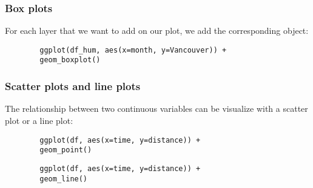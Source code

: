 \documentclass{beamer}
\begin{document}
	\begin{frame}[fragile]
		\frametitle{Box plots}

		For each layer that we want to add on our plot, we add the corresponding object:

		\vspace{2em}

		\begin{exampleblock}{}
		\begin{BVerbatim}
		ggplot(df_hum, aes(x=month, y=Vancouver)) + 
		geom_boxplot()
		\end{BVerbatim}
		\end{exampleblock}{}
		
	\end{frame}

	\begin{frame}[fragile]
		\frametitle{Scatter plots and line plots}

		The relationship between two continuous variables can be visualize with a scatter plot or a line plot:

		\vspace{2em}

		\begin{exampleblock}{}
		\begin{BVerbatim}
		ggplot(df, aes(x=time, y=distance)) +
		geom_point()
		\end{BVerbatim}
		\end{exampleblock}{}

		\vspace{2em}

		\begin{exampleblock}{}
		\begin{BVerbatim}
		ggplot(df, aes(x=time, y=distance)) +
		geom_line()
		\end{BVerbatim}
		\end{exampleblock}{}
		
	\end{frame}
\end{document}
